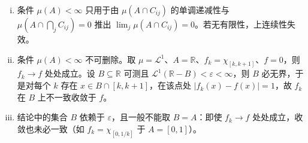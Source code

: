 \documentclass[../../main.tex]{subfiles}%
\begin{document}
\begin{remark}\label{remark:ch01-thm-1-16-条件}
\begin{enumerate}[(i)]
\item 条件 $\mu(A)<\infty$ 只用于由 $\mu(A\cap C_{ij})$ 的单调递减性与 $\mu(A\cap\bigcap_jC_{ij})=0$ 推出 $\lim_{j}\mu(A\cap C_{ij})=0$。若无有限性，上连续性失效。
\item 条件 $\mu(A)<\infty$ 不可删除。取 $\mu=\mathcal{L}^1$、$A=\mathbb{R}$、$f_k=\chi_{[k,k+1]}$、$f=0$，则 $f_k\to f$ 处处成立。设 $B\subseteq\mathbb{R}$ 可测且 $\mathcal{L}^1(\mathbb{R}-B)<\varepsilon<\infty$，则 $B$ 必无界，于是对每个 $k$ 存在 $x\in B\cap[k,k+1]$，在该点处 $\lvert f_k(x)-f(x)\rvert=1$，故 $f_k$ 在 $B$ 上不一致收敛于 $f$。
\item 结论中的集合 $B$ 依赖于 $\varepsilon$，且一般不能取 $B=A$：即使 $f_k\to f$ 处处成立，收敛也未必一致（如 $f_k=\chi_{[0,1/k]}$ 于 $A=[0,1]$）。
\end{enumerate}
\end{remark}
\end{document}
